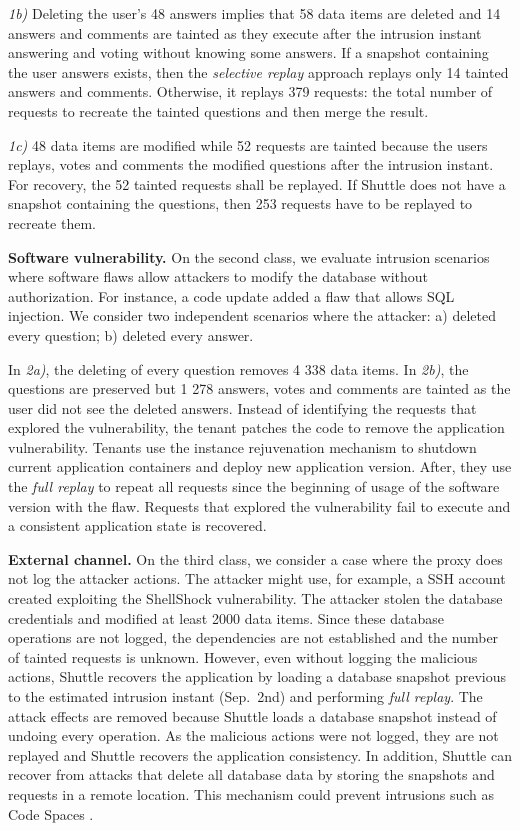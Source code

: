 \textit{1b)} Deleting the user's 48 answers implies that 58 data items are deleted and 14 answers and comments are tainted as they execute after the intrusion instant answering and voting without knowing some answers. If a snapshot containing the user answers exists, then the \textit{selective replay} approach replays only 14 tainted answers and comments. Otherwise, it replays 379 requests: the total number of requests to recreate the tainted questions and then merge the result.


\textit{1c)} 48 data items are modified while 52 requests are tainted because the users replays, votes and comments the modified questions after the intrusion instant. For recovery, the 52 tainted requests shall be replayed. If Shuttle does not have a snapshot containing the questions, then 253 requests have to be replayed to recreate them. 

\textbf{Software vulnerability.}
On the second class, we evaluate intrusion scenarios where software flaws allow attackers to modify the database without authorization. For instance, a code update added a flaw that allows SQL injection. We consider two independent scenarios where the attacker: a) deleted every question; b) deleted every answer.

In \textit{2a)}, the deleting of every question removes 4 338 data items. In \textit{2b)}, the questions are preserved but 1 278 answers, votes and comments are tainted as the user did not see the deleted answers.
%
Instead of identifying the requests that explored the vulnerability, the tenant patches the code to remove the application vulnerability. Tenants use the instance rejuvenation mechanism to shutdown current application containers and deploy new application version. After, they use the \textit{full replay} to repeat all requests since the beginning of usage of the software version with the flaw. Requests that explored the vulnerability fail to execute and a consistent application state is recovered.



\textbf{External channel.}
On the third class, we consider a case where the proxy does not log the attacker actions. The attacker might use, for example, a SSH account created exploiting the ShellShock vulnerability. The attacker stolen the database credentials and modified at least 2000 data items. Since these database operations are not logged, the dependencies are not established and the number of tainted requests is unknown. However, even without logging the malicious actions, Shuttle recovers the application by loading a database snapshot previous to the estimated intrusion instant (Sep.~2nd) and performing \textit{full replay}. The attack effects are removed because Shuttle loads a database snapshot instead of undoing every operation. As the malicious actions were not logged, they are not replayed and Shuttle recovers the application consistency. In addition, Shuttle can recover from attacks that delete all database data by storing the snapshots and requests in a remote location. This mechanism could prevent intrusions such as Code Spaces \cite{McAllister:14}.


